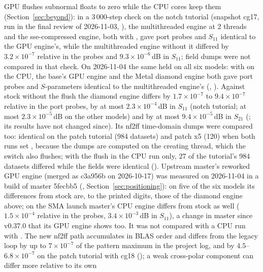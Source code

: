 \begin{itemize}
  GPU flushes subnormal floats to zero while the CPU cores keep them (Section~\ref{sec:beyond}): in a 3\,000-step
  check on the notch tutorial (snapshot cg17, run in the final review of 2026-11-03,
  ), the multithreaded engine at 2 threads and the sse-compressed engine,
  both with , gave port probes and $S_{11}$ identical to the GPU engine's, while the
  multithreaded engine without it differed by $3.2\times10^{-7}$ relative in the probes and $9.3\times10^{-6}$\,dB in
  $S_{11}$; field dumps were not compared in that check. On 2026-11-04 the same held on all six models: with
   on the CPU, the base's GPU engine and the Metal diamond engine both gave port probes and
  $S$-parameters identical to the multithreaded engine's (,
  ). Against stock without the flush the diamond engine
  differs by $1.7\times10^{-7}$ to $9.4\times10^{-7}$ relative in the port probes, by at most
  $2.3\times10^{-4}$\,dB in $S_{11}$ (notch tutorial; at most $2.3\times10^{-5}$\,dB on the other models) and by at
  most $9.4\times10^{-5}$\,dB in $S_{21}$ (; its results have not changed since). Its nf2ff
  time-domain dumps were compared too: identical on the patch tutorial (984 datasets) and patch x5 (120) when both
  runs set , because the dumps are computed on the creating thread, which the switch also
  flushes; with the flush in the CPU run only, 27 of the tutorial's 984 datasets differed while the fields were
  identical (). Upstream master's reworked GPU engine (merged as
  c3a956b on 2026-10-17) was measured on 2026-11-04 in a build of master 5fecbb5 (,
  Section~\ref{sec:positioning}): on five of the six models its differences from stock are, to the printed digits,
  those of the diamond engine above; on the SMA launch master's CPU engine differs from stock as well
  ($1.5\times10^{-4}$ relative in the probes, $3.4\times10^{-3}$\,dB in $S_{11}$), a change in master since v0.37.0
  that its GPU engine shows too. It was not compared with a CPU run with . The new nf2ff path
  accumulates in BLAS order and differs from the legacy loop by up to $7\times10^{-7}$ of the pattern maximum in the
  project log, and by $4.5$--$6.8\times10^{-7}$ on the patch tutorial with cg18
  (); a weak cross-polar component can differ more relative to its own

\end{itemize}
